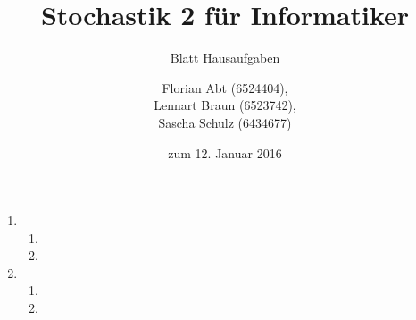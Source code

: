 \documentclass[a4paper]{scrartcl}
\title{Stochastik 2 für Informatiker}
\subtitle{Blatt {\blattnr} Hausaufgaben}
\author{
    Florian Abt (6524404), \\
    Lennart Braun (6523742), \\
    Sascha Schulz (6434677)
}
\date{zum 12. Januar 2016}
\def \blattnr {11}
\begin{document}
\maketitle

\begin{enumerate}[label=\bfseries \blattnr.\arabic*]
    \item %
        \begin{enumerate}
            \item

            \item

        \end{enumerate}

    \item %
        \begin{enumerate}
            \item

            \item

        \end{enumerate}


\end{enumerate}
\end{document}
